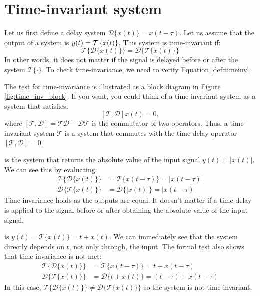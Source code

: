 \section{Time-invariant system}

Let us first define a delay system $\mathcal{D}\{x(t)\} = x(t-\tau)$. 
Let us assume that the output of a system is $y(t) = \spop[x(t)]$. 
This system is time-invariant if:
\begin{equation}
   \boxed{
      \mathcal{T}\{\mathcal{D}\{x(t)\}\} = \mathcal{D}\{\mathcal{T}\{x(t)\}\}
      \label{def:timeinv}
   }
\end{equation}
In other words, it does not matter if the signal is delayed before or after 
the system $\mathcal{T}\{\cdot\}$. To check time-invariance, we need to verify Equation \ref{def:timeinv}.

The test for time-invariance is illustrated as a block diagram in Figure \ref{fig:time_inv_block}.
If you want, you could think of a time-invariant system as a system that satisfies:
$$[\mathcal{T},\mathcal{D}]x(t)=0,$$
where $[\mathcal{T},\mathcal{D}]=\mathcal{T}\mathcal{D}-\mathcal{D}\mathcal{T}$ is the commutator of two operators.
Thus, a time-invariant system $\mathcal{T}$ is a system that commutes with the time-delay operator $[\mathcal{T},\mathcal{D}]=0$.

 is the system that returns the 
absolute value of the input signal $y(t)=|x(t)|$. We can see this by evaluating:
\begin{align}
   \mathcal{T}\{\mathcal{D}\{x(t)\}\} & = \mathcal{T}\{x(t-\tau)\}=|x(t-\tau)| \\
   \mathcal{D}\{\mathcal{T}\{x(t)\}\} & = \mathcal{D}\{|x(t)|\}=|x(t-\tau)|
\end{align}
Time-invariance holds as the outputs are equal. It doesn't matter if a time-delay is 
applied to the signal before or after obtaining the absolute value of the input signal.

 is $y(t) = \mathcal{T}\{x(t)\} = t + x(t)$. 
We can immediately see that the system directly depends on $t$, not only through, the input.
The formal test also shows that time-invariance is not met:
\begin{align}
   \mathcal{T}\{\mathcal{D}\{x(t)\}\} & = \mathcal{T}\{x(t-\tau)\}=t+x(t-\tau)       \\
   \mathcal{D}\{\mathcal{T}\{x(t)\}\} & = \mathcal{D}\{t + x(t)\}=(t-\tau)+x(t-\tau)
\end{align}
In this case, $\mathcal{T}\{\mathcal{D}\{x(t)\}\}\neq\mathcal{D}\{\mathcal{T}\{x(t)\}\}$ so the system is not time-invariant.

